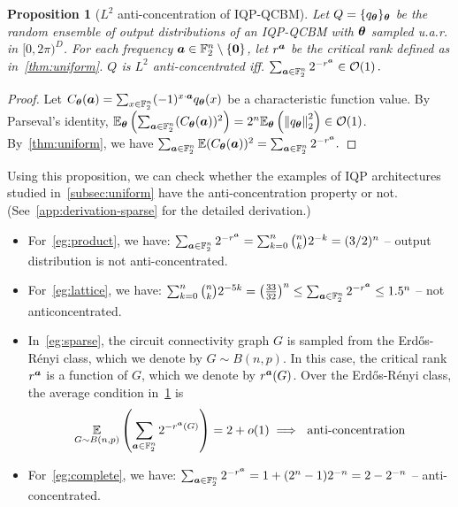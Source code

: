 \documentclass{article}
\theoremstyle{plain}
\newtheorem{proposition}[theorem]{Proposition}
\theoremstyle{definition}
\theoremstyle{remark}
\begin{document}
\begin{proposition}[$L^2$ anti-concentration of IQP-QCBM]
\label{lem:parseval} Let $Q = \{q_{\bm{\theta}}\}_{\bm{\theta}}$ be the random ensemble of output distributions of an IQP-QCBM with ${\bm{\theta}}$ sampled u.a.r. in $[0,2\pi)^D$. For each frequency ${\bm{a}} \in \mathbb{F}_2^n \setminus \{\mathbf{0}\}$, let $r^{\bm{a}}$ be the critical rank defined as in~\cref{thm:uniform}. $Q$ is $L^2$ anti-concentrated iff. $\sum_{{\bm{a}}\in\mathbb{F}_2^n}2^{-r^{\bm{a}}} \in \mathcal{O}(1)\,.$
\end{proposition}
\begin{proof}
    Let $C_{\bm{\theta}}({\bm{a}}) = \sum_{x\in \mathbb{F}_2^n} (-1)^{x\cdot {\bm{a}}}q_{\bm{\theta}}(x)$ be a characteristic function value.
    By Parseval's identity, $\mathbb{E}_{\bm{\theta}}\left(\sum_{{\bm{a}}\in \mathbb{F}_2^n}(C_{\bm{\theta}}({\bm{a}}))^2\right)=2^n\mathbb{E}_{\bm{\theta}}\left(\norm{q_{\bm{\theta}}}^2_2\right)\in\mathcal{O}(1)$. By~\cref{thm:uniform}, we have $\sum_{{\bm{a}}\in \mathbb{F}_2^n}\mathbb{E}(C_{\bm{\theta}}({\bm{a}}))^2=\sum_{{\bm{a}}\in\mathbb{F}_2^n}2^{-r^{\bm{a}}}.$
\end{proof}
Using this proposition, we can check whether the examples of IQP architectures studied in~\cref{subsec:uniform} have the anti-concentration property or not. (See~\cref{app:derivation-sparse} for the detailed derivation.)
\begin{itemize}
    \item For~\cref{eg:product}, we have: $\sum_{{\bm{a}} \in \mathbb{F}_2^n}  2^{-r^{\bm{a}}}=\sum_{k=0}^n \binom{n}{k}2^{-k}=(3/2)^n$ -- output distribution is not anti-concentrated.
    \item For~\cref{eg:lattice}, we have: $\sum_{k=0}^n \binom{n}{k}2^{-5k}=\left(\frac{33}{32}\right)^n \leq \sum_{{\bm{a}} \in \mathbb{F}_2^n} 2^{-r^{\bm{a}}} \leq 1.5^n$ --  not anticoncentrated.
    \item In~\cref{eg:sparse}, the circuit connectivity graph $G$ is sampled from the Erd\H os-R\'enyi class, which we denote by $G\sim B(n,p)$. In this case, the critical rank $r^{{\bm{a}}}$ is a function of $G$, which we denote by $r^{{\bm{a}}}(G)$. Over the Erd\H os-R\'enyi class, the average condition in~\cref{lem:parseval} is 
    \begin{equation}\label{eq:anti-concentration-sparse}
    \operatorname*{\mathbb{E}}_{G\sim B(n,p)}\left(\sum_{{\bm{a}} \in \mathbb{F}_2^n}  2^{-r^{\bm{a}}(G)}\right)
    = 2 + o(1)\implies \text{ anti-concentration}
    \end{equation} 
    \item For~\cref{eg:complete}, we have: $\sum_{{\bm{a}} \in \mathbb{F}_2^n} 2^{-r^{\bm{a}}}= 1+(2^n-1)2^{-n} = 2 - 2^{-n}$ -- anti-concentrated.
\end{itemize}
\end{document}
